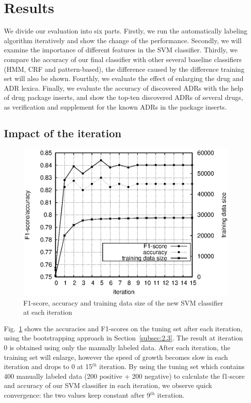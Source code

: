 \section{Results}
\label{results}
We divide our evaluation into six parts. Firstly, we run the automatically labeling algorithm iteratively and show the change of the performance. Secondly, we will examine the importance of different features in the SVM classifier. Thirdly, we compare the accuracy of our final classifier with other several baseline classifiers (HMM, CRF and pattern-based), the difference caused by the difference training set will also be shown. Fourthly, we evaluate the effect of enlarging the drug and ADR lexica. Finally, we evaluate the accuracy of discovered ADRs with the help of drug package inserts, and show the top-ten discovered ADRs of several drugs, as verification and supplement for the known ADRs in the package inserts.

\subsection{Impact of the iteration}
\label{subsec:3.1}
\begin{figure}
\centering
	\includegraphics[width=0.6\columnwidth]{Fig3.eps}
	\caption{F1-score, accuracy and training data size of the new SVM classifier at 
each iteration}
	\label{fig:3}       %
\end{figure}

Fig.~\ref{fig:3} shows the accuracies and F1-scores on the tuning set after each iteration, using the bootstrapping approach in Section~\ref{subsec:2.3}. The result at iteration 0 is obtained using only the manually labeled data. After each iteration, the training set will enlarge, however the speed of growth becomes slow in each iteration and drops to 0 at 15$^{th}$ iteration. By using the tuning set which contains 400 manually labeled data (200 positive + 200 negative) to calculate the f1-score and accuracy of our SVM classifier in each iteration, we observe quick convergence: the two values keep constant after 9$^{th}$ iteration. 

